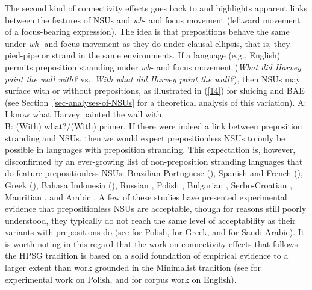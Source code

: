 {The second kind of connectivity effects goes back to \citet{Merchant2001, Merchant2005a} and highlights apparent links between the features of NSUs and \emph{wh}- and focus movement (leftward movement of a focus-bearing expression). The idea is that prepositions behave the same under \emph{wh}- and focus movement as they do under clausal ellipsis, that is, they pied-pipe or strand in the same environments. If a language (e.g., English) permits preposition stranding under \emph{wh}- and focus movement (\emph{What did Harvey paint the wall with?} vs.\ \emph{With what did Harvey paint the wall?}), then NSUs may surface with or without prepositions, as illustrated in (\ref{14}) for sluicing and BAE (see Section~\ref{sec-analyses-of-NSUs} for a theoretical analysis of this variation).
%
\ea A: I know what Harvey painted the wall with.\\B: (With) what?/(With) primer.\label{14}\z
%
If there were indeed a link between preposition stranding and NSUs, then we would expect prepositionless NSUs to only be possible in languages with preposition stranding. This expectation is, however, disconfirmed by an ever-growing list of non-preposition stranding languages that do feature prepositionless NSUs: Brazilian Portuguese (\citealt{AlmeidaYoshida2007}), Spanish and French (\citealt{Rodrigues2006}), Greek (\citealt{Molimpakis2018}), Bahasa Indonesia (\citealt{Fortin2007}), %
 Russian \citep{Philippova2014}, Polish \citep{Szczegielniak2008, Sag2011, Nykiel2013}, %
Bulgarian \citep{Abels2017}, Serbo-Croatian \citep{Stjepanovic2008, Stjepanovic2012}, Mauritian \citet{Abeille2019}, and %
Arabic \citep{Leung2014, Alshaalan2020}. A few of these studies have presented experimental evidence that prepositionless NSUs are acceptable, though for reasons still poorly understood, they typically do not reach the same level of acceptability as their variants with prepositions do (see \citealt{Nykiel2013} for Polish, \citealt{Molimpakis2018} for Greek, and \citealt{Alshaalan2020} for Saudi Arabic). It is worth noting in this regard that the work on connectivity effects that follows the HPSG tradition is based on a solid foundation of empirical evidence to a larger extent than work grounded in the Minimalist tradition (see \citealt{Sag2011, Nykiel2013} for experimental work on Polish, and \citealt{Nykiel2015, Nykiel2017, Nykiel2020} for corpus work on English).

}
